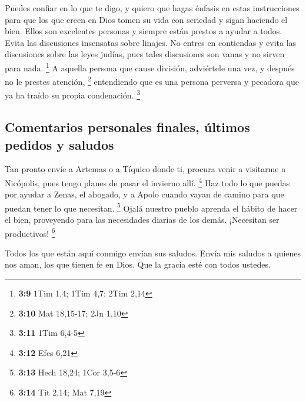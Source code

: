  Puedes confiar en lo que te digo, y quiero que hagas
énfasis en estas instrucciones para que los que creen en Dios tomen su
vida con seriedad y sigan haciendo el bien. Ellos son excelentes
personas y siempre están prestos a ayudar a todos.  Evita
las discusiones insensatas sobre linajes. No entres en contiendas y
evita las discusiones sobre las leyes judías, pues tales discusiones son
vanas y no sirven para nada. \footnote{\textbf{3:9} 1Tim 1,4; 1Tim 4,7;
  2Tim 2,14}  A aquella persona que cause división,
adviértele una vez, y después no le prestes atención, \footnote{\textbf{3:10}
  Mat 18,15-17; 2Jn 1,10}  entendiendo que es una persona
perversa y pecadora que ya ha traído su propia condenación. \footnote{\textbf{3:11}
  1Tim 6,4-5}

\hypertarget{comentarios-personales-finales-uxfaltimos-pedidos-y-saludos}{%
\subsection{Comentarios personales finales, últimos pedidos y
saludos}\label{comentarios-personales-finales-uxfaltimos-pedidos-y-saludos}}

 Tan pronto envíe a Artemas o a Tíquico donde ti, procura
venir a visitarme a Nicópolis, pues tengo planes de pasar el invierno
allí. \footnote{\textbf{3:12} Efes 6,21}  Haz todo lo que
puedas por ayudar a Zenas, el abogado, y a Apolo cuando vayan de camino
para que puedan tener lo que necesitan. \footnote{\textbf{3:13} Hech
  18,24; 1Cor 3,5-6}  Ojalá nuestro pueblo aprenda el
hábito de hacer el bien, proveyendo para las necesidades diarias de los
demás. ¡Necesitan ser productivos! \footnote{\textbf{3:14} Tit 2,14; Mat
  7,19}

 Todos los que están aquí conmigo envían sus saludos.
Envía mis saludos a quienes nos aman, los que tienen fe en Dios. Que la
gracia esté con todos ustedes.
